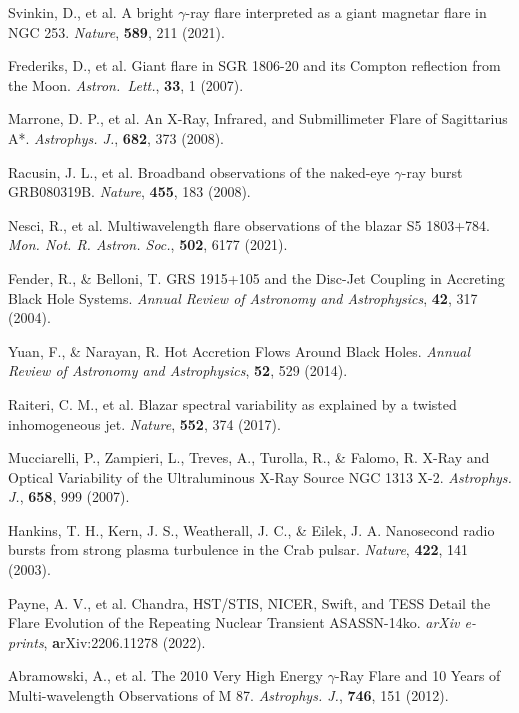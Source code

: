\documentclass{nature_plusfigure}
\newcommand{\mn}{{Mon. Not. R. Astron. Soc.}}
\newcommand{\mnras}{\mn}
\newcommand{\apj}{{Astrophys. J.}}
\newcommand{\nat}{{Nature}}
\newcommand{\araa}{Annual Review of Astronomy and Astrophysics}
\begin{document}
\begin{methods}
\begin{thebibliography}{10}

 Svinkin, D., et al. 
A bright {\ensuremath{\gamma}}-ray flare interpreted as a giant magnetar flare in NGC 253. \emph{\nat}, \textbf{589}, 211 (2021).

 Frederiks, D., et al. 
Giant flare in SGR 1806-20 and its Compton reflection from the Moon. \emph{Astron.~Lett.}, \textbf{33}, 1 (2007). 

 Marrone, D. P., et al. An X-Ray, Infrared, and Submillimeter Flare of Sagittarius A*. \emph{\apj}, \textbf{682}, 373 (2008). 

 Racusin, J. L., et al. Broadband observations of the naked-eye $\gamma$-ray burst GRB080319B. \emph{\nat}, \textbf{455}, 183 (2008). 

 Nesci, R., et al. Multiwavelength flare observations of the blazar S5 1803+784. \emph{\mnras}, \textbf{502}, 6177 (2021). 

 Fender, R., \& Belloni, T. GRS 1915+105 and the Disc-Jet Coupling in Accreting Black Hole Systems. \emph{\araa}, \textbf{42}, 317 (2004). 

 Yuan, F., \& Narayan, R. Hot Accretion Flows Around Black Holes. \emph{\araa}, \textbf{52}, 529 (2014). 

 Raiteri, C. M., et al. Blazar spectral variability as explained by a twisted inhomogeneous jet. \emph{\nat}, \textbf{552}, 374 (2017). 
 
 Mucciarelli, P., Zampieri, L., Treves, A., Turolla, R., \& Falomo, R. X-Ray and Optical Variability of the Ultraluminous X-Ray Source NGC 1313 X-2. \emph{\apj}, \textbf{658}, 999 (2007). 

 Hankins, T. H., Kern, J. S., Weatherall, J. C., \& Eilek, J. A. Nanosecond radio bursts from strong plasma turbulence in the Crab pulsar. \emph{\nat}, \textbf{422}, 141 (2003). 

 Payne, A. V., et al. Chandra, HST/STIS, NICER, Swift, and TESS Detail the Flare Evolution of the Repeating Nuclear Transient ASASSN-14ko. \emph{arXiv e-prints}, \textbf arXiv:2206.11278 (2022). 

 Abramowski, A., et al. The 2010 Very High Energy $\gamma$-Ray Flare and 10 Years of Multi-wavelength Observations of M 87. \emph{\apj}, \textbf{746}, 151 (2012). 


\end{thebibliography}
\end{methods}
\end{document}
